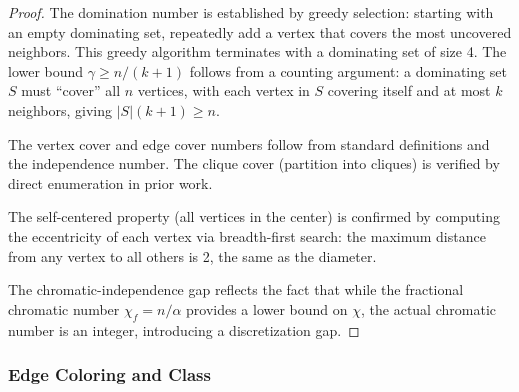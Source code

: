 \documentclass[12pt,a4paper]{article}
\begin{document}
\begin{proof}
The domination number is established by greedy selection: starting with an empty dominating set,
repeatedly add a vertex that covers the most uncovered neighbors. This greedy algorithm terminates
with a dominating set of size 4. The lower bound $\gamma \ge n/(k+1)$ follows from a counting argument:
a dominating set $S$ must ``cover'' all $n$ vertices, with each vertex in $S$ covering itself and
at most $k$ neighbors, giving $|S|(k+1) \ge n$.

The vertex cover and edge cover numbers follow from standard definitions and the independence number.
The clique cover (partition into cliques) is verified by direct enumeration in prior work.

The self-centered property (all vertices in the center) is confirmed by computing the eccentricity of each
vertex via breadth-first search: the maximum distance from any vertex to all others is 2, the same as
the diameter.

The chromatic-independence gap reflects the fact that while the fractional chromatic number $\chi_f = n/\alpha$
provides a lower bound on $\chi$, the actual chromatic number is an integer, introducing a discretization
gap.
\end{proof}

\subsubsection{Edge Coloring and Class}
\end{document}
